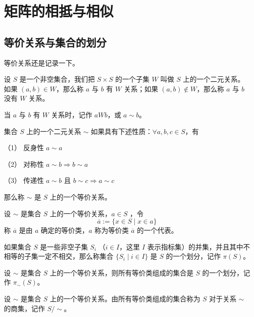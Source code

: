 \chapter{矩阵的相抵与相似}

\section{等价关系与集合的划分}

等价关系还是记录一下。

\begin{definition}
    设 $S$ 是一个非空集合，我们把 $S\times S$ 的一个子集 $W$ 叫做 $S$ 上的一个二元关系。如果 $(a,b)\in W$，那么称 $a$ 与 $b$ 有 $W$ 关系；如果 $(a,b)\notin W$，那么称 $a$ 与 $b$ 没有 $W$ 关系。
\end{definition}

当 $a$ 与 $b$ 有 $W$ 关系时，记作 $aWb$，或 $a\sim b$。

\begin{definition}
    集合 $S$ 上的一个二元关系 $\sim$ 如果具有下述性质：$\forall a,b,c\in S$，有

    （1） 反身性 $a\sim a$

    （2） 对称性 $a\sim b \Rightarrow b\sim a$

    （3） 传递性 $a\sim b$ 且 $b\sim c \Rightarrow a\sim c$ 

    那么称 $\sim$ 是 $S$ 上的一个等价关系。
\end{definition}

\begin{definition}
    设 $\sim$ 是集合 $S$ 上的一个等价关系，$a\in S$ ，令
    $$\overline{a} := \{x\in S \mid x\in a\}$$
    称 $\overline{a}$ 是由 $a$ 确定的等价类，$a$ 称为等价类 $\overline{a}$ 的一个代表。
\end{definition}

\begin{definition}
    如果集合 $S$ 是一些非空子集 $S_i$ （$i\in I$，这里 $I$ 表示指标集）的并集，并且其中不相等的子集一定不相交，那么称集合 $\{S
    _i \mid i\in I\}$ 是 $S$ 的一个划分，记作 $\pi(S)$。
\end{definition}

\begin{theorem}
    设 $\sim$ 是集合 $S$ 上的一个等价关系，则所有等价类组成的集合是 $S$ 的一个划分，记作 $\pi_\sim(S)$。
\end{theorem}

\begin{definition}
    设 $\sim$ 是集合 $S$ 上的一个等价关系。由所有等价类组成的集合称为 $S$ 对于关系 $\sim$ 的商集，记作 $S/\sim$。
\end{definition}

